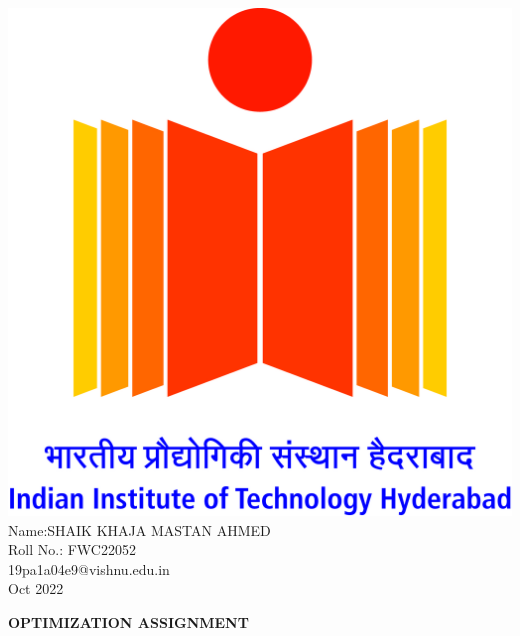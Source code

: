 \documentclass[10pt,a4paper]{report}
\begin{document}
\begin{multicols}{2}
\raggedright {\includegraphics[scale=0.06]{IITH logo.jpg}} \vspace{3mm}\\ \raggedleft Name:SHAIK KHAJA MASTAN AHMED\vspace{2mm}\\ 
\raggedleft Roll No.: FWC22052\vspace{2mm}\\ 
\raggedleft 19pa1a04e9@vishnu.edu.in \vspace{2mm}\\ 
\raggedleft Oct 2022 \vspace{5mm}\\
\end{multicols}

\centering \Large \textbf{OPTIMIZATION ASSIGNMENT} \normalsize \vspace{10mm}
\end{document}
